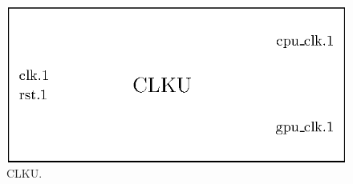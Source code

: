 \begin{figure}[H]
    \centering
    \includegraphics[scale=1.0]{Chapter4-GPU_CLKU/res/clku}
    \caption{CLKU.}
    \label{fig:clku/clku}
\end{figure}

